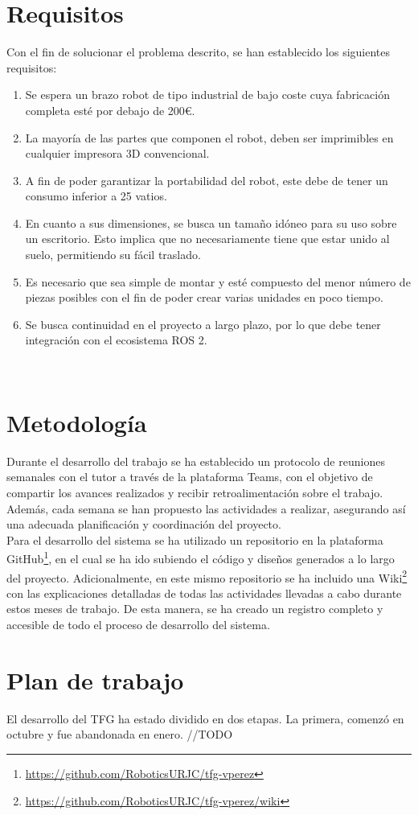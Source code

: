 \section{Requisitos}
\label{sec:requisitos}
Con el fin de solucionar el problema descrito, se han establecido los siguientes requisitos:
\begin{enumerate}
      \item Se espera un brazo robot de tipo industrial de bajo coste cuya fabricación completa esté por debajo de 200\euro.
      \item La mayoría de las partes que componen el robot, deben ser imprimibles en cualquier impresora 3D convencional.
      \item A fin de poder garantizar la portabilidad del robot, este debe de tener un consumo inferior a 25 vatios.
      \item En cuanto a sus dimensiones, se busca un tamaño idóneo para su uso sobre un escritorio. Esto implica que no necesariamente 
      tiene que estar unido al suelo, permitiendo su fácil traslado.
      \item Es necesario que sea simple de montar y esté compuesto del menor número de piezas posibles con el fin de poder crear varias unidades 
      en poco tiempo. 
      \item Se busca continuidad en el proyecto a largo plazo, por lo que debe tener integración con el ecosistema \acs{ROS} 2. 

\end{enumerate}\

\section{Metodología}
\label{sec:metodologia}

Durante el desarrollo del trabajo se ha establecido un protocolo de reuniones semanales con el tutor a 
través de la plataforma Teams, con el objetivo de compartir los avances realizados y recibir retroalimentación 
sobre el trabajo. Además, cada semana se han propuesto las actividades a realizar, asegurando así una adecuada 
planificación y coordinación del proyecto. \\
Para el desarrollo del sistema se ha utilizado un repositorio en la plataforma GitHub\footnote{\url{https://github.com/RoboticsURJC/tfg-vperez}}, en el cual se ha ido
subiendo el código y diseños generados a lo largo del proyecto. Adicionalmente, en este mismo repositorio 
se ha incluido una Wiki\footnote{\url{https://github.com/RoboticsURJC/tfg-vperez/wiki}} con las explicaciones detalladas de todas las actividades llevadas a cabo durante estos 
meses de trabajo. De esta manera, se ha creado un registro completo y accesible de todo el proceso de desarrollo del sistema.

\section{Plan de trabajo}
\label{sec:plantrabajo}
El desarrollo del TFG ha estado dividido en dos etapas. La primera, comenzó en octubre y fue abandonada en enero. 
//TODO